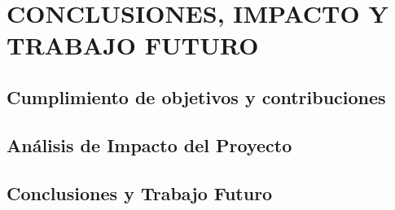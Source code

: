  \setcounter{subsection}{0}

\section{CONCLUSIONES, IMPACTO Y TRABAJO FUTURO}

\subsection{Cumplimiento de objetivos y contribuciones}

\subsection{Análisis de Impacto del Proyecto}

\subsection{Conclusiones y Trabajo Futuro}

